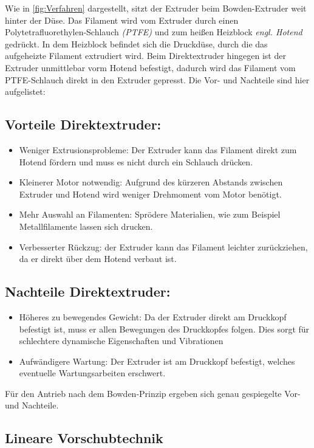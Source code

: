 Wie in \autoref{fig:Verfahren} dargestellt, sitzt der Extruder beim Bowden-Extruder weit hinter der Düse. Das Filament wird vom Extruder durch einen Polytetrafluorethylen-Schlauch \textit{(PTFE)} und zum heißen Heizblock \textit{engl. Hotend} gedrückt. In dem Heizblock befindet sich die Druckdüse, durch die das aufgeheizte Filament extrudiert wird. Beim Direktextruder hingegen ist der Extruder unmittlebar vorm Hotend befestigt, dadurch wird das Filament vom PTFE-Schlauch direkt in den Extruder gepresst. Die Vor- und Nachteile sind hier aufgelistet:

\subsection*{Vorteile Direktextruder:}
\begin{itemize}
    \item Weniger Extrusionsprobleme: Der Extruder kann das Filament direkt zum Hotend fördern und muss es nicht durch ein Schlauch drücken.
    \item Kleinerer Motor notwendig: Aufgrund des kürzeren Abstands zwischen Extruder und Hotend wird weniger Drehmoment vom Motor benötigt.
    \item Mehr Auswahl an Filamenten: Sprödere Materialien, wie zum Beispiel Metallfilamente lassen sich drucken.
    \item Verbesserter Rückzug: der Extruder kann das Filament leichter zurückziehen, da er direkt über dem Hotend verbaut ist.
\end{itemize}

\subsection*{Nachteile Direktextruder:}
\begin{itemize}
    \item Höheres zu bewegendes Gewicht: Da der Extruder direkt am Druckkopf befestigt ist, muss er allen Bewegungen des Druckkopfes folgen. Dies sorgt für schlechtere dynamische Eigenschaften und Vibrationen
    \item Aufwändigere Wartung: Der Extruder ist am Druckkopf befestigt, welches eventuelle Wartungsarbeiten erschwert.
\end{itemize}

Für den Antrieb nach dem Bowden-Prinzip ergeben sich genau gespiegelte Vor- und Nachteile. \autocite{facfox}

\subsection{Lineare Vorschubtechnik}
\label{sec:LineareVorschub}

